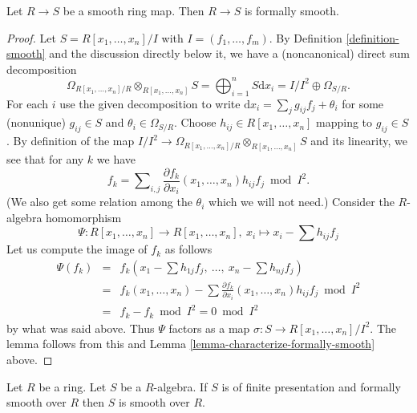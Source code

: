 \begin{lemma}
\label{lemma-smooth-formally-smooth}
Let $R \to S$ be a smooth ring map.
Then $R \to S$ is formally smooth.
\end{lemma}

\begin{proof}
Let $S = R[x_1, \ldots, x_n]/I$ with $I = (f_1, \ldots, f_m)$.
By Definition \ref{definition-smooth}
and the discussion directly below it, we have
a (noncanonical) direct sum decomposition
$$
\Omega_{R[x_1, \ldots, x_n]/R} \otimes_{R[x_1, \ldots, x_n]} S
= \bigoplus_{i = 1}^n S \text{d}x_i
= I/I^2 \oplus \Omega_{S/R}.
$$
For each $i$ use the given decomposition to write
$\text{d}x_i = \sum_j g_{ij} f_j + \theta_i$ for some (nonunique)
$g_{ij} \in S$ and $\theta_i \in \Omega_{S/R}$.
Choose $h_{ij} \in R[x_1, \ldots, x_n]$ mapping to $g_{ij} \in S$.
By definition of the map
$I/I^2 \to \Omega_{R[x_1, \ldots, x_n]/R} \otimes_{R[x_1, \ldots, x_n]} S$
and its linearity, we see that for any $k$ we have
$$
f_k =
\sum\nolimits_{i, j}
\frac{\partial f_k}{\partial x_i}(x_1, \ldots, x_n) h_{ij} f_j
\bmod I^2.
$$
(We also get some relation among the $\theta_i$ which we will
not need.)
Consider the $R$-algebra homomorphism
$$
\Psi :
R[x_1, \ldots, x_n] \to R[x_1, \ldots, x_n], \ 
x_i \mapsto x_i - \sum h_{ij} f_j
$$
Let us compute the image of $f_k$ as follows
\begin{eqnarray*}
\Psi(f_k) & = &
f_k(x_1 - \sum h_{1j} f_j, \ \ldots, \ x_n - \sum h_{nj} f_j) \\
& = &
f_k(x_1, \ldots, x_n) -
\sum \frac{\partial f_k}{\partial x_i}(x_1, \ldots, x_n) h_{ij} f_j
\bmod I^2 \\
& = & f_k - f_k \bmod I^2 = 0 \bmod I^2
\end{eqnarray*}
by what was said above. Thus $\Psi$ factors as a map
$\sigma : S \to R[x_1, \ldots, x_n]/I^2$. The lemma follows
from this and Lemma \ref{lemma-characterize-formally-smooth} above.
\end{proof}

\begin{lemma}
\label{lemma-formally-smooth-smooth}
Let $R$ be a ring. Let $S$ be a $R$-algebra.
If $S$ is of finite presentation and formally smooth over $R$
then $S$ is smooth over $R$.
\end{lemma}

